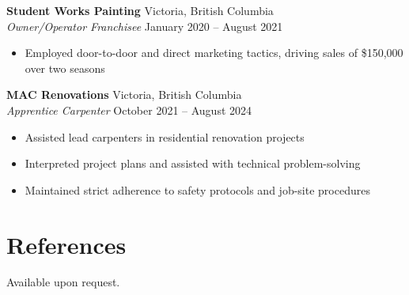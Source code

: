 \documentclass[11pt, letterpaper]{article}
\begin{document}
\medskip

\textbf{Student Works Painting} \hfill Victoria, British Columbia \\
\textit{Owner/Operator Franchisee} \hfill January 2020 -- August 2021
\begin{itemize}
    \item Employed door-to-door and direct marketing tactics, driving sales of
          \$150,000 over two seasons
\end{itemize}

\medskip

\textbf{MAC Renovations} \hfill Victoria, British Columbia \\
\textit{Apprentice Carpenter} \hfill October 2021 -- August 2024
\begin{itemize}
    \item Assisted lead carpenters in residential renovation projects
    \item Interpreted project plans and assisted with technical problem-solving
    \item Maintained strict adherence to safety protocols and job-site procedures
\end{itemize}

\section{References}

Available upon request.
\end{document}

